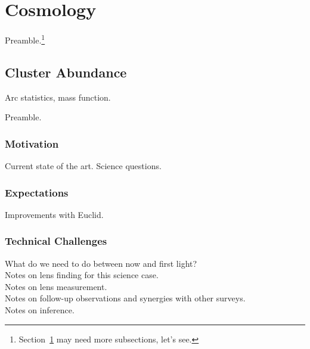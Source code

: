 \documentclass{article}
\begin{document}
\section{Cosmology} 
\label{sec:cosmology}



Preamble.\footnote{Section~\ref{sec:cosmology} may need more subsections, let's see.}


\subsection{Cluster Abundance}



Arc statistics, mass function.

Preamble.

\subsubsection{Motivation}
Current state of the art. Science questions.\\

\subsubsection{Expectations}
Improvements with Euclid.\\

\subsubsection{Technical Challenges}

What do we need to do between now and first light?\\

Notes on lens finding for this science case.\\

Notes on lens measurement.\\

Notes on follow-up observations and synergies with other surveys.\\

Notes on inference.\\
\end{document}

